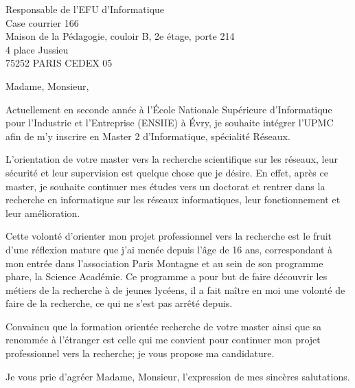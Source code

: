 \documentclass[NF,paper=a4,pagesize,enlargefirstpage=on,fontsize=12pt,sieben]{scrlttr2}
\begin{document}
\begin{letter}{
	Responsable de l'EFU d'Informatique \\
		Case courrier 166 \\
		Maison de la Pédagogie, couloir B, 2e étage, porte 214 \\
		4 place Jussieu \\
		75252 PARIS CEDEX 05}


		\opening{Madame, Monsieur,}


Actuellement en seconde année à l'École Nationale Supérieure d'Informatique
pour l'Industrie et l'Entreprise (ENSIIE) à Évry, je souhaite intégrer
l'UPMC afin de m'y inscrire en Master 2 d'Informatique, spécialité Réseaux.


L'orientation de votre master vers la recherche scientifique sur les réseaux,
leur sécurité et leur supervision est quelque chose que je désire.  En effet,
après ce master, je souhaite continuer mes études vers un doctorat et rentrer
dans la recherche en informatique sur les réseaux informatiques, leur
fonctionnement et leur amélioration.


Cette volonté d'orienter mon projet professionnel vers la recherche est le
fruit d'une réflexion mature que j'ai menée depuis l'âge de 16 ans,
correspondant à mon entrée dans l'association Paris Montagne et au sein de son
programme phare, la Science Académie. Ce programme a pour but de faire
découvrir les métiers de la recherche à de jeunes lycéens, il a fait naître en
moi une volonté de faire de la recherche, ce qui ne s'est pas arrêté depuis. 

Convaincu que la formation orientée recherche de votre master ainsi que sa
renommée à l'étranger est celle qui me convient pour continuer mon projet
professionnel vers la recherche; je vous propose ma candidature.


\closing{Je vous prie d'agréer Madame, Monsieur, l'expression de mes sincères
salutations.}

\end{letter}
\end{document}
